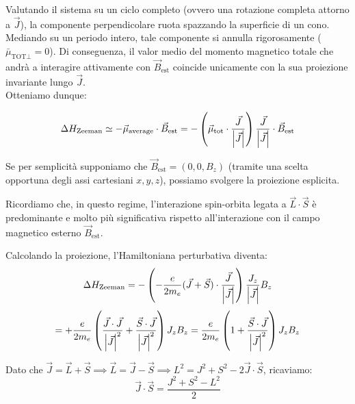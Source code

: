 Valutando il sistema su un ciclo completo (ovvero una rotazione completa attorno a \( \vec{J} \)), la componente perpendicolare ruota spazzando la superficie di un cono. Mediando su un periodo intero, tale componente si annulla rigorosamente (\( \bar{\mu}_{\text{TOT}\perp} = 0 \)).
Di conseguenza, il valor medio del momento magnetico totale che andrà a interagire attivamente con \( \vec{B}_{\text{est}} \) coincide unicamente con la sua proiezione invariante lungo \( \vec{J} \).\\
Otteniamo dunque:
\begin{importantbox}
    \begin{equation}
        \Delta H_{\text{Zeeman}} \simeq - \vec{\mu}_{\text{average}} \cdot \vec{B}_{\text{est}} = - \left( \vec{\mu}_{\text{tot}} \cdot \frac{\vec{J}}{\abs{\vec{J}}} \right) \frac{\vec{J}}{\abs{\vec{J}}} \cdot \vec{B}_{\text{est}}
    \end{equation}
\end{importantbox}

Se per semplicità supponiamo che \( \vec{B}_{\text{est}} = (0, 0, B_z) \) (tramite una scelta opportuna degli assi cartesiani \( x, y, z \)), possiamo svolgere la proiezione esplicita.

Ricordiamo che, in questo regime, l'interazione spin-orbita legata a \( \vec{L} \cdot \vec{S} \) è predominante e molto più significativa rispetto all'interazione con il campo magnetico esterno \( \vec{B}_{\text{est}} \).

Calcolando la proiezione, l'Hamiltoniana perturbativa diventa:
\begin{equation*}
        \Delta H_{\text{Zeeman}} = - \left( -\frac{e}{2m_e} (\vec{J} + \vec{S}) \cdot \frac{\vec{J}}{\abs{\vec{J}}} \right) \frac{J_z}{\abs{\vec{J}}} B_z
\end{equation*}
\begin{equation}
    = + \frac{e}{2m_e} \left( \frac{\vec{J} \cdot \vec{J}}{\abs{\vec{J}}^2} + \frac{\vec{S} \cdot \vec{J}}{\abs{\vec{J}}^2} \right) J_z B_z 
= \frac{e}{2m_e} \left( 1 + \frac{\vec{S} \cdot \vec{J}}{\abs{\vec{J}}^2} \right) J_z B_z
\end{equation}

Dato che \( \vec{J} = \vec{L} + \vec{S} \implies \vec{L} = \vec{J} - \vec{S} \implies L^2 = J^2 + S^2 - 2\vec{J} \cdot \vec{S} \), ricaviamo:
\begin{equation}
    \vec{J} \cdot \vec{S} = \frac{J^2 + S^2 - L^2}{2}
\end{equation}

